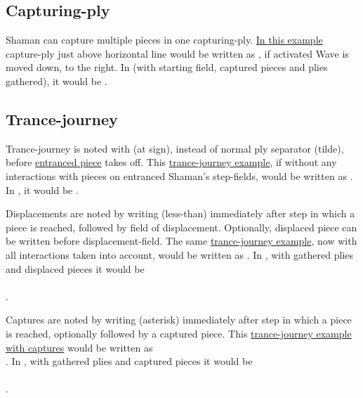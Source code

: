 \subsection*{Capturing-ply}
\label{sec:Appendix/Notation/Capturing-ply}

Shaman can capture multiple pieces in one capturing-ply.
\hyperref[fig:scn_cot_03_light_shaman_capture_ply]{In this example} capture-ply just above
horizontal line would be written as , if activated Wave is moved
down, to the right. In  (with starting field, captured pieces and plies gathered),
it would be \alg{[Hd9.h10*P.l11*P.p12]\~{}[Wn8]}.

\subsection*{Trance-journey}
\label{sec:Appendix/Notation/Trance-journey}

Trance-journey is noted with  (at sign), instead of normal ply separator \alg{\~{}}
(tilde), before \hyperref[fig:scn_o_22_light_starchild_init_trance_journey]{entranced piece} takes
off. This \hyperref[fig:scn_cot_18_light_light_shaman_interaction_start]{trance-journey example},
if without any interactions with pieces on entranced Shaman's step-fields, would be written
as . In , it would be .

Displacements are noted by writing \alg{<} (less-than) immediately after step in which a
piece is reached, followed by field of displacement. Optionally, displaced piece can be
written before displacement-field. The same
\hyperref[fig:scn_cot_19_light_light_shaman_interaction_end]{trance-journey example},
now with all interactions taken into account, would be written as
. In , with gathered plies and
displaced pieces it would be \\
\\
\alg{[He13..e18<Ni14..m12<Pj17..g24]}.

Captures are noted by writing \alg{*} (asterisk) immediately after step in which a piece
is reached, optionally followed by a captured piece. This
\hyperref[fig:scn_cot_21_dark_light_shaman_interaction_end]{trance-journey example with captures}
would be written as \\
. In , with gathered plies and
captured pieces it would be \\
\\
\alg{[He13..e18*N..m12*P..g24]}.

